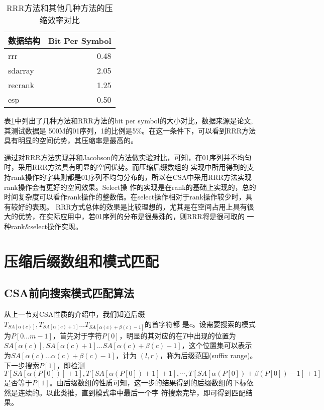 \begin{table}[htbp]
    \caption{RRR方法和其他几种方法的压缩效率对比}
    \label{tab:tabcom}
    \centering
    \begin{tabular}{lr}
    \toprule
    数据结构&Bit Per Symbol\\
    \midrule
    rrr&0.48\\
    sdarray&2.05\\
    recrank&1.25\\
    esp&0.50\\
    \bottomrule
    \end{tabular}
\end{table}

表\ref{tab:tabcom}中列出了几种方法和RRR方法的bit per symbol的大小对比，数据来源是论文\cite{claude2009practical},其测试数据是
500M的01序列，1的比例是5\%。在这一条件下，可以看到RRR方法具有明显的空间优势，其压缩率是最高的。

通过对RRR方法实现并和Jacobson的方法做实验对比，可知，在01序列并不均匀时，采用RRR方法具有明显的空间优势。而压缩后缀数组的
实现中所用得到的支持rank操作的字典则都是01序列不均匀分布的，所以在CSA中采用RRR方法实现rank操作会有更好的空间效果。Select操
作的实现是在rank的基础上实现的，总的时间复杂度可以看作rank操作的整数倍。在select操作相对于rank操作较少时，具有较好的表现。
RRR方式总体的效果是比较理想的，尤其是在空间占用上具有很大的优势，在实际应用中，若01序列的分布是很悬殊的，则RRR将是很可取的
一种rank\&select操作实现。

\section{压缩后缀数组和模式匹配}
\subsection{CSA前向搜索模式匹配算法}
从上一节对CSA性质的介绍中，我们知道后缀$T_{SA[\alpha(c)]},T_{SA[\alpha(c)+1]}\ldots T_{SA[\alpha(c)+\beta(c)-1]}$的首字符都
是$c$。设需要搜索的模式为$P[0\ldots m-1]$，首先对于字符$P[0]$，明显的其对应的在$T$中出现的位置为
$SA[\alpha(c)],SA[\alpha(c)+1]\ldots SA[\alpha(c)+\beta(c)-1]$，这个位置集可以表示为$SA[\alpha(c)\ldots\alpha(c)+\beta(c)-1]$，计为
$(l,r)$，称为后缀范围(suffix range)。下一步搜索$P[1]$，即检测$T[SA[\alpha(P[0])]+1],T[SA[\alpha(P[0])+1]+1],\cdots ,T[SA[\alpha(P[0])+\beta(P[0])-1]+1]$
是否等于$P[1]$。由后缀数组的性质可知，这一步的结果得到的后缀数组的下标依然是连续的。以此类推，直到模式串中最后一个字
符搜索完毕，即可得到匹配结果。

